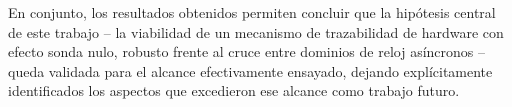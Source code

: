 En conjunto, los resultados obtenidos permiten concluir que la hipótesis
central de este trabajo -- la viabilidad de un mecanismo de trazabilidad
de hardware con efecto sonda nulo, robusto frente al cruce entre dominios
de reloj asíncronos -- queda validada para el alcance efectivamente
ensayado, dejando explícitamente identificados los aspectos que excedieron
ese alcance como trabajo futuro.